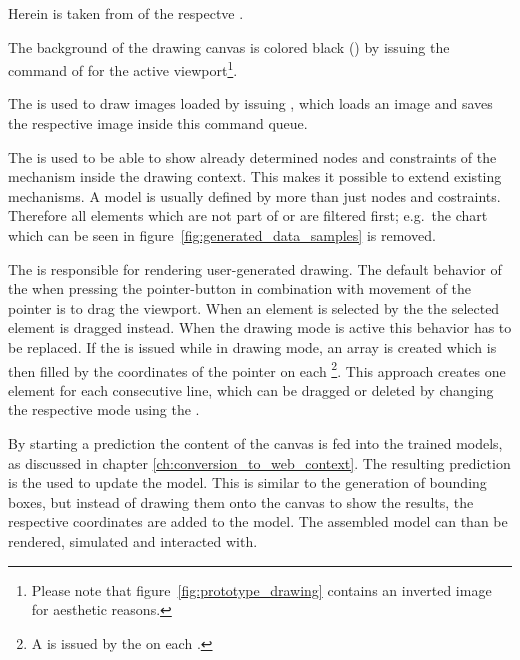 Herein  is taken from  of the respectve  .

The background of the drawing canvas is colored black () by issuing the  command of  for the active viewport\footnote{Please note that figure~\ref{fig:prototype_drawing} contains an inverted image for aesthetic reasons.}.

The  is used to draw images loaded by issuing , which loads an image and saves the respective image inside this command queue.

The  is used to be able to show already determined nodes and constraints of the mechanism inside the drawing context.
This makes it possible to extend existing mechanisms.
A  model is usually defined by more than just nodes and costraints.
Therefore all elements which are not part of  or  are filtered first; e.g.\ the chart which can be seen in figure~\ref{fig:generated_data_samples} is removed.

The  is responsible for rendering user-generated drawing.
The default behavior of the  when pressing the pointer-button in combination with movement of the pointer is to drag the viewport.
When an element is selected by the  the selected element is dragged instead.
When the drawing mode is active this behavior has to be replaced.
If the  is issued while in drawing mode, an array is created which is then filled by the coordinates of the pointer on each \footnote{A  is issued by the  on each .}.
This approach creates one  element for each consecutive line, which can be dragged or deleted by changing the respective mode using the  .

By starting a prediction the content of the canvas is fed into the trained models, as discussed in chapter \ref{ch:conversion_to_web_context}.
The resulting prediction is the used to update the  model.
This is similar to the generation of bounding boxes, but instead of drawing them onto the canvas to show the results, the respective coordinates are added to the  model.
The assembled  model can than be rendered, simulated and interacted with.

